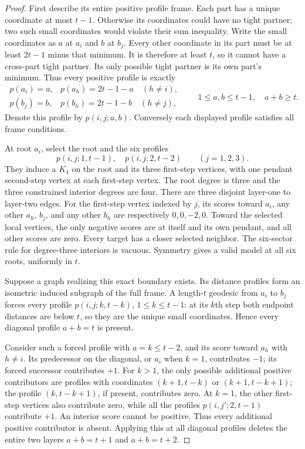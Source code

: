 \begin{proof}
First describe its entire positive profile frame. Each part has a unique
coordinate at most $t-1$. Otherwise its coordinates could have no tight
partner; two such small coordinates would violate their sum inequality.
Write the small coordinates as $a$ at $a_i$ and $b$ at $b_j$. Every other
coordinate in its part must be at least $2t-1$ minus that minimum. It is
therefore at least $t$, so it cannot have a cross-part tight partner. Its
only possible tight partner is its own part's minimum. Thus every positive
profile is exactly
\[
 \begin{array}{ll}
 p(a_i)=a,&p(a_h)=2t-1-a\quad(h\ne i),\\
 p(b_j)=b,&p(b_h)=2t-1-b\quad(h\ne j),
 \end{array}
 \qquad 1\le a,b\le t-1,\quad a+b\ge t.
\]
Denote this profile by $p(i,j;a,b)$. Conversely each displayed profile
satisfies all frame conditions.

At root $a_i$, select the root and the six profiles
\[
 p(i,j;1,t-1),\quad p(i,j;2,t-2)\qquad(j=1,2,3).
\]
They induce a $K_4$ on the root and its three first-step vertices, with one
pendant second-step vertex at each first-step vertex. The root degree is
three and the three constrained interior degrees are four. There are
three disjoint layer-one to layer-two edges. For the first-step vertex
indexed by $j$, its scores toward $a_i$, any other $a_h$, $b_j$, and any
other $b_h$ are respectively $0,0,-2,0$. Toward the selected local vertices,
the only negative scores are at itself and its own pendant, and all other
scores are zero. Every target has a closer selected neighbor. The
six-sector rule for degree-three interiors is vacuous. Symmetry gives a
valid model at all six roots, uniformly in $t$.

Suppose a graph realizing this exact boundary exists. Its distance profiles
form an isometric induced subgraph of the full frame. A length-$t$ geodesic
from $a_i$ to $b_j$ forces every profile $p(i,j;k,t-k)$,
$1\le k\le t-1$: at its $k$th step both endpoint distances are below $t$,
so they are the unique small coordinates. Hence every diagonal profile
$a+b=t$ is present.

Consider such a forced profile with $a=k\le t-2$, and its score toward
$a_h$ with $h\ne i$. Its predecessor on the diagonal, or $a_i$ when $k=1$,
contributes $-1$; its forced successor contributes $+1$. For $k>1$, the
only possible additional positive contributors are profiles with
coordinates $(k+1,t-k)$ or $(k+1,t-k+1)$; the profile $(k,t-k+1)$, if
present, contributes zero. At $k=1$, the other first-step vertices also
contribute zero, while all the profiles $p(i,j';2,t-1)$ contribute $+1$.
An interior score cannot be positive. Thus every additional positive
contributor is absent. Applying this at all diagonal profiles deletes the
entire two layers $a+b=t+1$ and $a+b=t+2$.


\end{proof}
